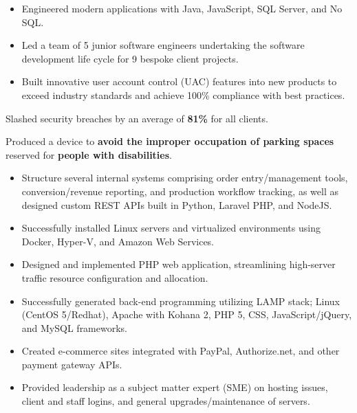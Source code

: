 	\begin{itemize}
		\item Engineered modern applications with Java, JavaScript, SQL Server, and No SQL.
		\item Led a team of 5 junior software engineers undertaking the software development life cycle for 9 bespoke client projects.
		\item Built innovative user account control (UAC) features into new products to exceed industry standards and achieve 100\% compliance with best practices.
	\end{itemize}
	Slashed security breaches by an average of \textbf{81\%} for all clients.
	
	\medskip

		Produced a device to \textbf{avoid the improper occupation of parking spaces} reserved for \textbf{people with disabilities}.
	\begin{itemize}
		\item Structure several internal systems comprising order entry/management tools, conversion/revenue reporting, and production workflow tracking, as well as designed custom REST APIs built in Python, Laravel PHP, and NodeJS.
		\item Successfully installed Linux servers and virtualized environments using Docker, Hyper-V, and Amazon Web Services.
		\item Designed and implemented PHP web application, streamlining high-server traffic resource configuration and allocation.
	\end{itemize}

	\medskip
	
	\begin{itemize}
		\item Successfully generated back-end programming utilizing LAMP stack; Linux (CentOS 5/Redhat), Apache with Kohana 2, PHP 5, CSS, JavaScript/jQuery, and MySQL frameworks.
		\item Created e-commerce sites integrated with PayPal, Authorize.net, and other payment gateway APIs.
		\item Provided leadership as a subject matter expert (SME) on hosting issues, client and staff logins, and general upgrades/maintenance of servers.
	\end{itemize}

